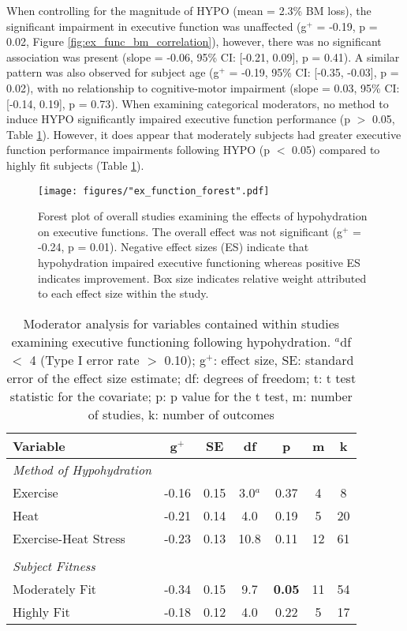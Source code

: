 When controlling for the magnitude of HYPO (mean = 2.3\% BM loss), the significant impairment in executive function was unaffected (g${^+}$ =  -0.19, p = 0.02, Figure \ref{fig:ex_func_bm_correlation}), however, there was no significant association was present (slope = -0.06, 95\% CI: [-0.21, 0.09], p = 0.41). A similar pattern was also observed for subject age (g${^+}$ = -0.19, 95\% CI: [-0.35, -0.03], p = 0.02), with no relationship to cognitive-motor impairment (slope = 0.03, 95\% CI: [-0.14, 0.19], p = 0.73). When examining categorical moderators, no method to induce HYPO significantly impaired executive function performance (p ${>}$ 0.05, Table \ref{tbl:ex_func_moderators}). However, it does appear that moderately subjects had greater executive function performance impairments following HYPO (p ${<}$ 0.05) compared to highly fit subjects (Table \ref{tbl:ex_func_moderators}).

\begin{figure}
	\texttt{[image: figures/"ex\_function\_forest".pdf]}
	\caption{Forest plot of overall studies examining the effects of hypohydration on executive functions. The overall effect was not significant (g${^+}$ = -0.24, p = 0.01). Negative effect sizes (ES) indicate that hypohydration impaired executive functioning whereas positive ES indicates improvement. Box size indicates relative weight attributed to each effect size within the study.}
	\label{fig:ex_func_ma}
\end{figure}

\begin{table}
	\caption{Moderator analysis for variables contained within studies examining executive functioning following hypohydration. ${^a}$df ${<}$ 4 (Type I error rate ${>}$ 0.10); g${^+}$: effect size, SE: standard error of the effect size estimate; df: degrees of freedom; t: t test statistic for the covariate; p: p value for the t test, m: number of studies, k: number of outcomes}
	\centering
	\begin{tabular}{lcccccc} 
		\hline
		\textbf{Variable} & \textbf{g${^+}$} & \textbf{SE} & \textbf{df} & \textbf{p} & \textbf{m} & 
		\textbf{k} \\
		\hline
		\textit{Method of Hypohydration} &&&&&& \\
		Exercise & -0.16 & 0.15 & 3.0${^a}$ & 0.37 & 4 & 8 \\
		Heat & -0.21 & 0.14 & 4.0 & 0.19 & 5 & 20 \\ 
		Exercise-Heat Stress & -0.23 & 0.13 & 10.8 & 0.11 & 12 & 61 \\
		&&&&&& \\
		\textit{Subject Fitness} &&&&&& \\
		Moderately Fit & -0.34 & 0.15 & 9.7 & \textbf{0.05} & 11 & 54 \\
		Highly Fit & -0.18 & 0.12 & 4.0 & 0.22 & 5 & 17 \\
		\hline		    
	\end{tabular}
	\label{tbl:ex_func_moderators}
\end{table}

